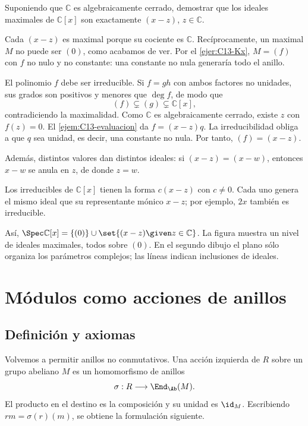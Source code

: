 \begin{ejer}\label{ejer:C13-complejos}
Suponiendo que $\mathbb C$ es algebraicamente cerrado, demostrar que los ideales maximales de $\mathbb C[x]$ son exactamente $(x-z)$, $z\in\mathbb C$.
\end{ejer}
\begin{sol}
Cada $(x-z)$ es maximal porque su cociente es $\mathbb C$. Recíprocamente, un maximal $M$ no puede ser $(0)$, como acabamos de ver. Por el \cref{ejer:C13-Kx}, $M=(f)$ con $f$ no nulo y no constante: una constante no nula generaría todo el anillo.

El polinomio $f$ debe ser irreducible. Si $f=gh$ con ambos factores no unidades, sus grados son positivos y menores que $\deg f$, de modo que
\[
(f)\subsetneq(g)\subsetneq\mathbb C[x],
\]
contradiciendo la maximalidad. Como $\mathbb C$ es algebraicamente cerrado, existe $z$ con $f(z)=0$. El \cref{ejem:C13-evaluacion} da $f=(x-z)q$. La irreducibilidad obliga a que $q$ sea unidad, es decir, una constante no nula. Por tanto, $(f)=(x-z)$.

Además, distintos valores dan distintos ideales: si $(x-z)=(x-w)$, entonces $x-w$ se anula en $z$, de donde $z=w$.
\end{sol}
\begin{obs}
Los irreducibles de $\mathbb C[x]$ tienen la forma $c(x-z)$ con $c\ne0$. Cada uno genera el mismo ideal que su representante mónico $x-z$; por ejemplo, $2x$ también es irreducible.
\end{obs}

Así, $\Spec\mathbb C[x]=\{(0)\}\cup\set{(x-z)\given z\in\mathbb C}$. La figura muestra un nivel de ideales maximales, todos sobre $(0)$. En el segundo dibujo el plano sólo organiza los parámetros complejos; las líneas indican inclusiones de ideales.


\section{Módulos como acciones de anillos}
\subsection{Definición y axiomas}
Volvemos a permitir anillos no conmutativos. Una acción izquierda de $R$ sobre un grupo abeliano $M$ es un homomorfismo de anillos
\[
\sigma:R\longrightarrow\End_{\Ab}(M).
\]
El producto en el destino es la composición y su unidad es $\id_M$. Escribiendo $rm=\sigma(r)(m)$, se obtiene la formulación siguiente.

